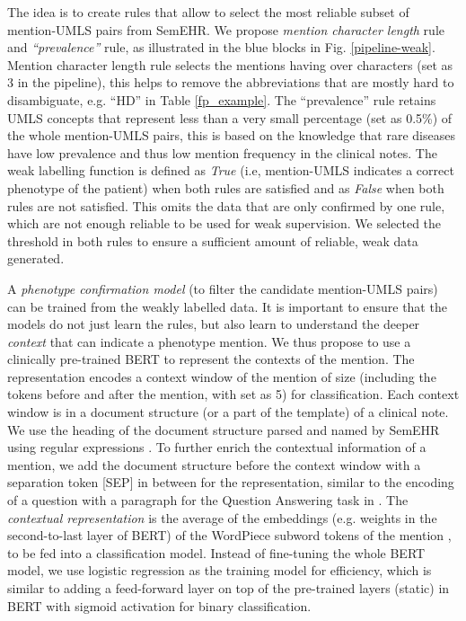 \documentclass[letterpaper, 10 pt, conference]{ieeeconf}
\begin{document}
The idea is to create rules that allow to select the most reliable subset of mention-UMLS pairs from SemEHR. We propose \textit{mention character length} rule and \textit{``prevalence''} rule, as illustrated in the blue blocks in Fig. \ref{pipeline-weak}. Mention character length rule selects the mentions having over  characters (set as 3 in the pipeline), this helps to remove the abbreviations that are mostly hard to disambiguate, e.g. ``HD'' in Table \ref{fp_example}. The ``prevalence'' rule retains UMLS concepts that represent less than a very small percentage (set as 0.5\%) of the whole mention-UMLS pairs, this is based on the knowledge that rare diseases have low prevalence \cite{scot_gov_2021,textoris_genetic_2014} and thus low mention frequency in the clinical notes. The weak labelling function  is defined as \emph{True} (i.e, mention-UMLS indicates a correct phenotype of the patient) when both rules are satisfied and as \emph{False} when both rules are not satisfied. This omits the data that are only confirmed by one rule, which are not enough reliable to be used for weak supervision. We selected the threshold in both rules to ensure a sufficient amount of reliable, weak data generated.

A \emph{phenotype confirmation model} (to filter the candidate mention-UMLS pairs) can be trained from the weakly labelled data. It is important to ensure that the models do not just learn the rules, but also learn to understand the deeper \textit{context} that can indicate a phenotype mention. We thus propose to use a clinically pre-trained BERT to represent the contexts of the mention. The representation encodes a context window of the mention of size  (including the  tokens before and after the mention, with  set as 5) for classification. Each context window is in a document structure (or a part of the template) of a clinical note. We use the heading of the document structure parsed and named by SemEHR using regular expressions \cite{Wu2018semehr}. To further enrich the contextual information of a mention, we add the document structure before the context window with a separation token [SEP] in between for the representation, similar to the encoding of a question with a paragraph for the Question Answering task in \cite{devlin-etal-2019-bert}. The \emph{contextual representation} is the average of the embeddings (e.g. weights in the second-to-last layer of BERT) of the WordPiece subword tokens of the mention \cite{devlin-etal-2019-bert}, to be fed into a classification model. Instead of fine-tuning the whole BERT model, we use logistic regression as the training model for efficiency, which is similar to adding a feed-forward layer on top of the pre-trained layers (static) in BERT with sigmoid activation for binary classification.
\end{document}
